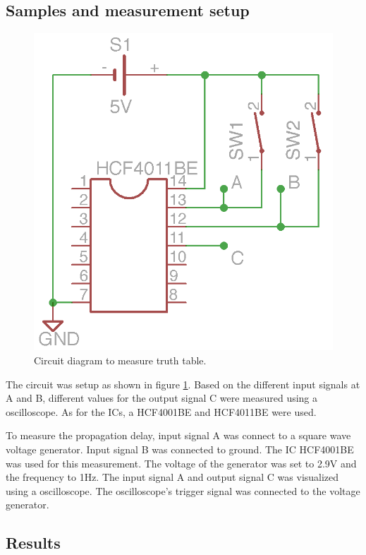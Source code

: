 \documentclass[journal]{IEEEtran}
\begin{document}
\subsection{Samples and measurement setup}

\begin{figure}[h!]
  \centering
   \includegraphics[]{boards/truth.png}
   \caption{Circuit diagram to measure truth table.}
   \label{fig:truth_circuit}
\end{figure}

The circuit was setup as shown in figure \ref{fig:truth_circuit}. Based on the
different input signals at A and B, different values for the output signal C
were measured using a oscilloscope. As for the ICs, a HCF4001BE and HCF4011BE
were used.

To measure the propagation delay, input signal A was connect to a square wave
voltage generator. Input signal B was connected to ground. The IC HCF4001BE
was used for this measurement. The voltage of the generator was set to 2.9V and
the frequency to 1Hz. The input signal A and output signal C was visualized
using a oscilloscope. The oscilloscope's trigger signal was connected to the voltage
generator.

\subsection{Results}
\end{document}

